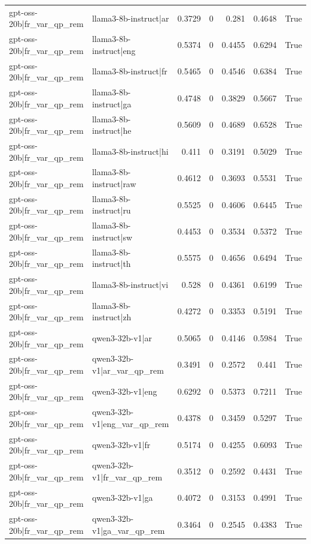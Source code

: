 \begin{table}
\begin{tabular}{l l r r r r l}
gpt-oss-20b|fr_var_qp_rem & llama3-8b-instruct|ar & 0.3729 & 0 & 0.281 & 0.4648 & True \\
gpt-oss-20b|fr_var_qp_rem & llama3-8b-instruct|eng & 0.5374 & 0 & 0.4455 & 0.6294 & True \\
gpt-oss-20b|fr_var_qp_rem & llama3-8b-instruct|fr & 0.5465 & 0 & 0.4546 & 0.6384 & True \\
gpt-oss-20b|fr_var_qp_rem & llama3-8b-instruct|ga & 0.4748 & 0 & 0.3829 & 0.5667 & True \\
gpt-oss-20b|fr_var_qp_rem & llama3-8b-instruct|he & 0.5609 & 0 & 0.4689 & 0.6528 & True \\
gpt-oss-20b|fr_var_qp_rem & llama3-8b-instruct|hi & 0.411 & 0 & 0.3191 & 0.5029 & True \\
gpt-oss-20b|fr_var_qp_rem & llama3-8b-instruct|raw & 0.4612 & 0 & 0.3693 & 0.5531 & True \\
gpt-oss-20b|fr_var_qp_rem & llama3-8b-instruct|ru & 0.5525 & 0 & 0.4606 & 0.6445 & True \\
gpt-oss-20b|fr_var_qp_rem & llama3-8b-instruct|sw & 0.4453 & 0 & 0.3534 & 0.5372 & True \\
gpt-oss-20b|fr_var_qp_rem & llama3-8b-instruct|th & 0.5575 & 0 & 0.4656 & 0.6494 & True \\
gpt-oss-20b|fr_var_qp_rem & llama3-8b-instruct|vi & 0.528 & 0 & 0.4361 & 0.6199 & True \\
gpt-oss-20b|fr_var_qp_rem & llama3-8b-instruct|zh & 0.4272 & 0 & 0.3353 & 0.5191 & True \\
gpt-oss-20b|fr_var_qp_rem & qwen3-32b-v1|ar & 0.5065 & 0 & 0.4146 & 0.5984 & True \\
gpt-oss-20b|fr_var_qp_rem & qwen3-32b-v1|ar_var_qp_rem & 0.3491 & 0 & 0.2572 & 0.441 & True \\
gpt-oss-20b|fr_var_qp_rem & qwen3-32b-v1|eng & 0.6292 & 0 & 0.5373 & 0.7211 & True \\
gpt-oss-20b|fr_var_qp_rem & qwen3-32b-v1|eng_var_qp_rem & 0.4378 & 0 & 0.3459 & 0.5297 & True \\
gpt-oss-20b|fr_var_qp_rem & qwen3-32b-v1|fr & 0.5174 & 0 & 0.4255 & 0.6093 & True \\
gpt-oss-20b|fr_var_qp_rem & qwen3-32b-v1|fr_var_qp_rem & 0.3512 & 0 & 0.2592 & 0.4431 & True \\
gpt-oss-20b|fr_var_qp_rem & qwen3-32b-v1|ga & 0.4072 & 0 & 0.3153 & 0.4991 & True \\
gpt-oss-20b|fr_var_qp_rem & qwen3-32b-v1|ga_var_qp_rem & 0.3464 & 0 & 0.2545 & 0.4383 & True \\

\end{tabular}
\end{table}

